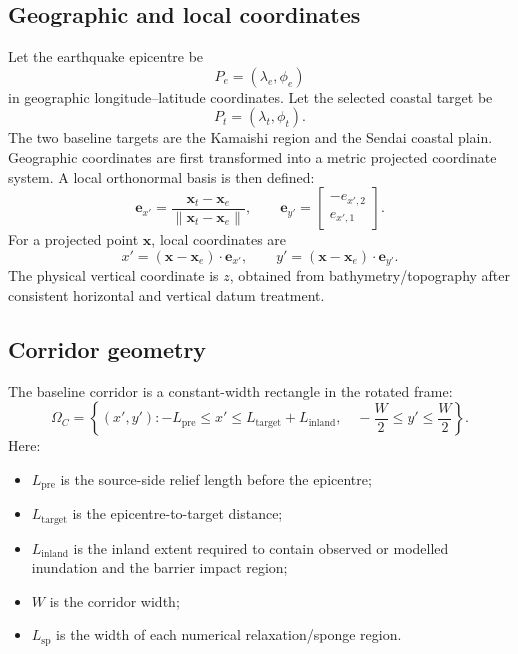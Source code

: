 \documentclass[11pt,a4paper]{article}
\newcommand{\vect}[1]{\bm{#1}}
\begin{document}
\subsection{Geographic and local coordinates}

Let the earthquake epicentre be
\begin{equation}
  P_e=(\lambda_e,\phi_e)
\end{equation}
in geographic longitude--latitude coordinates. Let the selected coastal target be
\begin{equation}
  P_t=(\lambda_t,\phi_t).
\end{equation}
The two baseline targets are the Kamaishi region and the Sendai coastal plain. Geographic coordinates are first transformed into a metric projected coordinate system. A local orthonormal basis is then defined:
\begin{equation}
  \vect e_{x'}=\frac{\vect x_t-\vect x_e}{\|\vect x_t-\vect x_e\|},
  \qquad
  \vect e_{y'}=\begin{bmatrix}-e_{x',2}\\ e_{x',1}\end{bmatrix}.
\end{equation}
For a projected point $\vect x$, local coordinates are
\begin{equation}
  x'=(\vect x-\vect x_e)\cdot\vect e_{x'},
  \qquad
  y'=(\vect x-\vect x_e)\cdot\vect e_{y'}.
\end{equation}
The physical vertical coordinate is $z$, obtained from bathymetry/topography after consistent horizontal and vertical datum treatment.

\subsection{Corridor geometry}

The baseline corridor is a constant-width rectangle in the rotated frame:
\begin{equation}
\Omega_C=
\left\{(x',y'):
-L_{\mathrm{pre}}\le x'\le L_{\mathrm{target}}+L_{\mathrm{inland}},\quad
-\frac{W}{2}\le y'\le \frac{W}{2}
\right\}.
\end{equation}
Here:
\begin{itemize}
  \item $L_{\mathrm{pre}}$ is the source-side relief length before the epicentre;
  \item $L_{\mathrm{target}}$ is the epicentre-to-target distance;
  \item $L_{\mathrm{inland}}$ is the inland extent required to contain observed or modelled inundation and the barrier impact region;
  \item $W$ is the corridor width;
  \item $L_{\mathrm{sp}}$ is the width of each numerical relaxation/sponge region.
\end{itemize}
\end{document}
